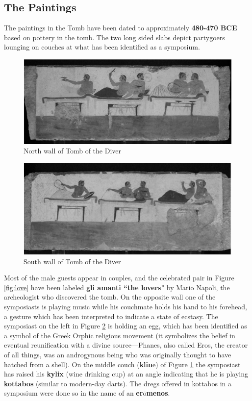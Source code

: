 \subsection{The Paintings}


The paintings in the Tomb have been dated to approximately \textbf{480-470 BCE} based on pottery in the tomb. The two long sided slabs depict partygoers lounging on couches at what has been identified as a symposium.

\begin{figure}[H]
    \centering
    \includegraphics[scale = 0.3]{../images/North.PNG}
    \caption{North wall of Tomb of the Diver}
    \label{fig:north}
\end{figure}

\begin{figure}[H]
    \centering
    \includegraphics[scale = 0.3]{../images/South.PNG}
    \caption{South wall of Tomb of the Diver}
    \label{fig:south}
\end{figure}

Most of the male guests appear in couples, and the celebrated pair in Figure \ref{fig:love} have been labeled \textbf{gli amanti ``the lovers"} by Mario Napoli, the archeologist who discovered the tomb. On the opposite wall one of the symposiasts is playing music while his couchmate holds his hand to his forehead, a gesture which has been interpreted to indicate a state of ecstasy. The symposiast on the left in Figure \ref{fig:south} is holding an egg, which has been identified as a symbol of the Greek Orphic religious movement (it symbolizes the belief in eventual reunification with a divine source---Phanes, also called Eros, the creator of all things, was an androgynous being who was originally thought to have hatched from a shell). On the middle couch (\textbf{klin$\overline{\text{e}}$}) of Figure \ref{fig:north} the symposiast has raised his \textbf{kylix} (wine drinking cup) at an angle indicating that he is playing \textbf{kottabos} (similar to modern-day darts). The dregs offered in kottabos in a symposium were done so in the name of an \textbf{er$\overline{\text{o}}$menos}.

